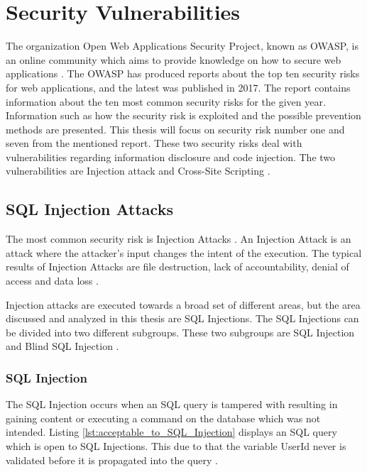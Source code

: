 \section{Security Vulnerabilities}
\label{SecurityVulnerabilities}
The organization Open Web Applications Security Project, known as OWASP, is an online community which aims to provide knowledge on how to secure web applications \parencite{OpenWebApplicationSecurityProject}. The OWASP has produced reports about the top ten security risks for web applications, and the latest was published in 2017. The report contains information about the ten most common security risks for the given year. Information such as how the security risk is exploited and the possible prevention methods are presented. This thesis will focus on security risk number one and seven from the mentioned report. These two security risks deal with vulnerabilities regarding information disclosure and code injection. The two vulnerabilities are Injection attack and Cross-Site Scripting \parencite{OWASP2017}.



\subsection{SQL Injection Attacks}
The most common security risk is Injection Attacks \parencite{OWASP2017}. An Injection Attack is an attack where the attacker's input changes the intent of the execution. The typical results of Injection Attacks are file destruction, lack of accountability, denial of access and data loss \parencite{Secure_Web}.

Injection attacks are executed towards a broad set of different areas, but the area discussed and analyzed in this thesis are SQL Injections. The SQL Injections can be divided into two different subgroups. These two subgroups are SQL Injection and Blind SQL Injection \parencite{Secure_Web}.



\subsubsection{SQL Injection}
The SQL Injection occurs when an SQL query is tampered with resulting in gaining content or executing a command on the database which was not intended. Listing \ref{lst:acceptable_to_SQL_Injection} displays an SQL query which is open to SQL Injections. This due to that the variable UserId never is validated before it is propagated into the query \parencite{JustinClarke-Salt2009SIAa, Secure_Web}.


